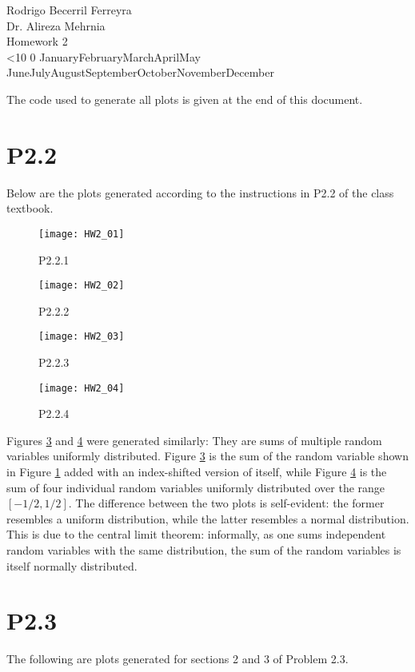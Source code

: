 \documentclass{article}
\renewcommand{\today}{\ifnum\number\day<10 0\fi \number\day \space%
\ifcase \month \or January\or February\or March\or April\or May%
\or June\or July\or August\or September\or October\or November\or December\fi\space%
\number \year}
\begin{document}
\noindent
Rodrigo Becerril Ferreyra\\
Dr. Alireza Mehrnia\\
Homework 2\\
\today

The code used to generate all plots is given at the end
of this document.

\section*{P2.2} Below are the plots generated according to the
instructions in P2.2 of the class textbook.

\begin{figure}[H]
    \centering
    \texttt{[image: HW2\_01]}
    \caption{P2.2.1}
    \label{P2.2.1}
\end{figure}

\begin{figure}[H]
    \centering
    \texttt{[image: HW2\_02]}
    \caption{P2.2.2}
    \label{P2.2.2}
\end{figure}

\begin{figure}[H]
    \centering
    \texttt{[image: HW2\_03]}
    \caption{P2.2.3}
    \label{P2.2.3}
\end{figure}

\begin{figure}[H]
    \centering
    \texttt{[image: HW2\_04]}
    \caption{P2.2.4}
    \label{P2.2.4}
\end{figure}

Figures \ref{P2.2.3} and \ref{P2.2.4} were generated similarly:
They are sums of multiple random variables uniformly
distributed. Figure \ref{P2.2.3} is the sum of the random variable
shown in Figure \ref{P2.2.1} added with an index-shifted
version of itself, while Figure \ref{P2.2.4} is the sum of four
individual random variables uniformly distributed over the range
\([-1/2, 1/2]\). The difference between the two plots is
self-evident: the former resembles a uniform distribution,
while the latter resembles a normal distribution. This is
due to the central limit theorem: informally, as one sums
independent random variables with the same distribution,
the sum of the random variables is itself normally distributed.

\section*{P2.3}
The following are plots generated for sections 2 and 3 of
Problem 2.3.
\end{document}
